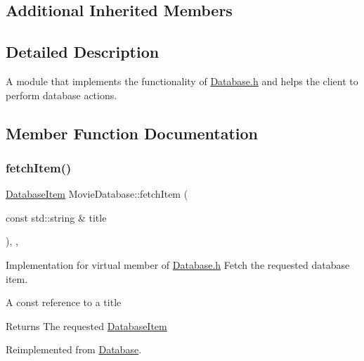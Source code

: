 \subsection*{Additional Inherited Members}


\subsection{Detailed Description}
A module that implements the functionality of \hyperlink{Database_8h_source}{Database.\+h} and helps the client to perform database actions. 



\subsection{Member Function Documentation}
\mbox{\label{classMovieDatabase_ac0bb39b8be599ffea76081809ae42dda}} 
\subsubsection{\texorpdfstring{fetch\+Item()}{fetchItem()}}
{\footnotesize\ttfamily \hyperlink{classDatabaseItem}{Database\+Item} Movie\+Database\+::fetch\+Item (\begin{DoxyParamCaption}\item[{const std\+::string \&}]{title }\end{DoxyParamCaption})\hspace{0.3cm}{\ttfamily [inline]}, {\ttfamily [override]}, {\ttfamily [virtual]}}



Implementation for virtual member of \hyperlink{Database_8h_source}{Database.\+h} Fetch the requested database item. 

A const reference to a title

\begin{DoxyReturn}{Returns}
The requested \hyperlink{classDatabaseItem}{Database\+Item}
\end{DoxyReturn}


Reimplemented from \hyperlink{classDatabase_a40254eec69c7d7cc15da24a9f0b072b3}{Database}.

\mbox{\label{classMovieDatabase_a9a386f51dd72d63414a124cbcfcd879b}} 
